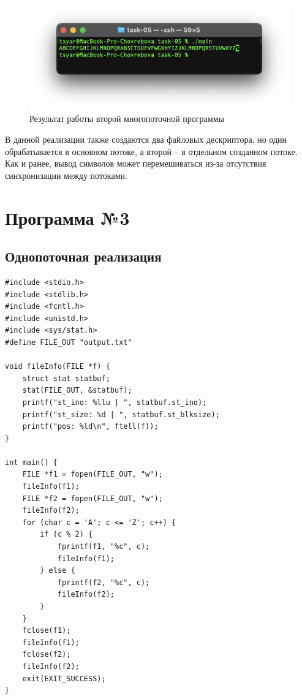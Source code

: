 \begin{figure}[h!] 
	\centering
	\includegraphics[width=1.0\textwidth]{./img/second-03.png}
	\caption{Результат работы второй многопоточной программы}
	\label{fig:232}
\end{figure}

В данной реализации также создаются два файловых дескриптора, но один обрабатывается в основном потоке, а второй -- в отдельном созданном потоке. Как и ранее, вывод символов может перемешиваться из-за отсутствия синхронизации между потоками.

\newpage
\section{Программа №3}

\subsection*{Однопоточная реализация}

\begin{lstlisting}[caption=Однопоточная программа,label=lst:FILEstruct112211]
#include <stdio.h>
#include <stdlib.h>
#include <fcntl.h>
#include <unistd.h>
#include <sys/stat.h>
#define FILE_OUT "output.txt"

void fileInfo(FILE *f) {
	struct stat statbuf;
	stat(FILE_OUT, &statbuf);
	printf("st_ino: %llu | ", statbuf.st_ino);
	printf("st_size: %d | ", statbuf.st_blksize);
	printf("pos: %ld\n", ftell(f));
}

int main() {
	FILE *f1 = fopen(FILE_OUT, "w");
	fileInfo(f1);
	FILE *f2 = fopen(FILE_OUT, "w");
	fileInfo(f2);
	for (char c = 'A'; c <= 'Z'; c++) {
		if (c % 2) {
			fprintf(f1, "%c", c);
			fileInfo(f1);
		} else {
			fprintf(f2, "%c", c);
			fileInfo(f2);
		}
	}
	fclose(f1);
	fileInfo(f1);
	fclose(f2);
	fileInfo(f2);
	exit(EXIT_SUCCESS);
}
\end{lstlisting}

